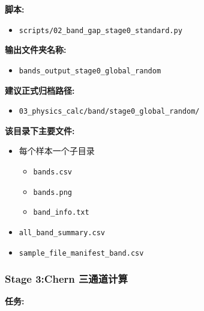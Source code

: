 \documentclass[lang=cn,scheme=chinese,color=blue,device=normal,toc=onecol,math=cm]{elegantbook}
\begin{document}
\textbf{脚本:}\par


\begin{itemize}
\item \texttt{scripts/\allowbreak{}02\_\allowbreak{}band\_\allowbreak{}gap\_\allowbreak{}stage0\_\allowbreak{}standard.py}
\end{itemize}


\textbf{输出文件夹名称:}\par


\begin{itemize}
\item \texttt{bands\_\allowbreak{}output\_\allowbreak{}stage0\_\allowbreak{}global\_\allowbreak{}random}
\end{itemize}


\textbf{建议正式归档路径:}\par


\begin{itemize}
\item \texttt{03\_\allowbreak{}physics\_\allowbreak{}calc/\allowbreak{}band/\allowbreak{}stage0\_\allowbreak{}global\_\allowbreak{}random/\allowbreak{}}
\end{itemize}


\textbf{该目录下主要文件:}\par


\begin{itemize}
\item 每个样本一个子目录 
\begin{itemize}
\item \texttt{bands.csv}
\item \texttt{bands.png}
\item \texttt{band\_\allowbreak{}info.txt}
\end{itemize}
\item \texttt{all\_\allowbreak{}band\_\allowbreak{}summary.csv}
\item \texttt{sample\_\allowbreak{}file\_\allowbreak{}manifest\_\allowbreak{}band.csv}
\end{itemize}


\subsubsection{Stage 3:Chern 三通道计算}


\textbf{任务:}\par
\end{document}
